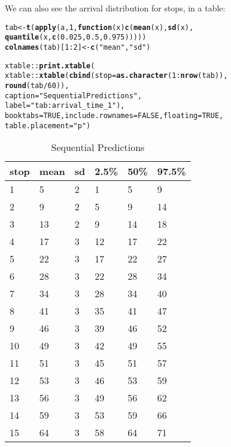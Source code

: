 \documentclass[11pt]{article}\usepackage[]{graphicx}\usepackage[]{color}
\makeatletter
\newcommand{\hlnum}[1]{\textcolor[rgb]{0.686,0.059,0.569}{#1}}%
\newcommand{\hlstr}[1]{\textcolor[rgb]{0.192,0.494,0.8}{#1}}%
\newcommand{\hlopt}[1]{\textcolor[rgb]{0,0,0}{#1}}%
\newcommand{\hlstd}[1]{\textcolor[rgb]{0.345,0.345,0.345}{#1}}%
\newcommand{\hlkwa}[1]{\textcolor[rgb]{0.161,0.373,0.58}{\textbf{#1}}}%
\newcommand{\hlkwb}[1]{\textcolor[rgb]{0.69,0.353,0.396}{#1}}%
\newcommand{\hlkwc}[1]{\textcolor[rgb]{0.333,0.667,0.333}{#1}}%
\newcommand{\hlkwd}[1]{\textcolor[rgb]{0.737,0.353,0.396}{\textbf{#1}}}%
\newenvironment{kframe}{%
 \def\at@end@of@kframe{}%
 \ifinner\ifhmode%
  \def\at@end@of@kframe{\end{minipage}}%
  \begin{minipage}{\columnwidth}%
 \fi\fi%
 \def\FrameCommand##1{\hskip\@totalleftmargin \hskip-\fboxsep
 \colorbox{shadecolor}{##1}\hskip-\fboxsep
     \hskip-\linewidth \hskip-\@totalleftmargin \hskip\columnwidth}%
 \MakeFramed {\advance\hsize-\width
   \@totalleftmargin\z@ \linewidth\hsize
   \@setminipage}}%
 {\par\unskip\endMakeFramed%
 \at@end@of@kframe}
\makeatother
\begin{document}
We can also see the arrival distribution for stops, in a table:
\begin{kframe}
\begin{alltt}
\hlstd{tab} \hlkwb{<-} \hlkwd{t}\hlstd{(}\hlkwd{apply}\hlstd{(a,} \hlnum{1}\hlstd{,} \hlkwa{function}\hlstd{(}\hlkwc{x}\hlstd{)} \hlkwd{c}\hlstd{(}\hlkwd{mean}\hlstd{(x),} \hlkwd{sd}\hlstd{(x),}
                                   \hlkwd{quantile}\hlstd{(x,} \hlkwd{c}\hlstd{(}\hlnum{0.025}\hlstd{,} \hlnum{0.5}\hlstd{,} \hlnum{0.975}\hlstd{)))))}
\hlkwd{colnames}\hlstd{(tab)[}\hlnum{1}\hlopt{:}\hlnum{2}\hlstd{]} \hlkwb{<-} \hlkwd{c}\hlstd{(}\hlstr{"mean"}\hlstd{,} \hlstr{"sd"}\hlstd{)}

\hlstd{xtable}\hlopt{::}\hlkwd{print.xtable}\hlstd{(}
    \hlstd{xtable}\hlopt{::}\hlkwd{xtable}\hlstd{(}\hlkwd{cbind}\hlstd{(}\hlkwc{stop} \hlstd{=} \hlkwd{as.character}\hlstd{(}\hlnum{1}\hlopt{:}\hlkwd{nrow}\hlstd{(tab)),}
                         \hlkwd{round}\hlstd{(tab} \hlopt{/} \hlnum{60}\hlstd{)),}
                   \hlkwc{caption} \hlstd{=} \hlstr{"Sequential Predictions"}\hlstd{,}
                   \hlkwc{label} \hlstd{=} \hlstr{"tab:arrival_time_1"}\hlstd{),}
    \hlkwc{booktabs} \hlstd{=} \hlnum{TRUE}\hlstd{,} \hlkwc{include.rownames} \hlstd{=} \hlnum{FALSE}\hlstd{,} \hlkwc{floating} \hlstd{=} \hlnum{TRUE}\hlstd{,}
    \hlkwc{table.placement} \hlstd{=} \hlstr{"p"}\hlstd{)}
\end{alltt}
\end{kframe}%
\begin{table}[p]
\centering
\begin{tabular}{llllll}
  \toprule
stop & mean & sd & 2.5\% & 50\% & 97.5\% \\ 
  \midrule
1 & 5 & 2 & 1 & 5 & 9 \\ 
  2 & 9 & 2 & 5 & 9 & 14 \\ 
  3 & 13 & 2 & 9 & 14 & 18 \\ 
  4 & 17 & 3 & 12 & 17 & 22 \\ 
  5 & 22 & 3 & 17 & 22 & 27 \\ 
  6 & 28 & 3 & 22 & 28 & 34 \\ 
  7 & 34 & 3 & 28 & 34 & 40 \\ 
  8 & 41 & 3 & 35 & 41 & 47 \\ 
  9 & 46 & 3 & 39 & 46 & 52 \\ 
  10 & 49 & 3 & 42 & 49 & 55 \\ 
  11 & 51 & 3 & 45 & 51 & 57 \\ 
  12 & 53 & 3 & 46 & 53 & 59 \\ 
  13 & 56 & 3 & 49 & 56 & 62 \\ 
  14 & 59 & 3 & 53 & 59 & 66 \\ 
  15 & 64 & 3 & 58 & 64 & 71 \\ 
   \bottomrule
\end{tabular}
\caption{Sequential Predictions} 
\label{tab:arrival_time_1}
\end{table}
\end{document}
